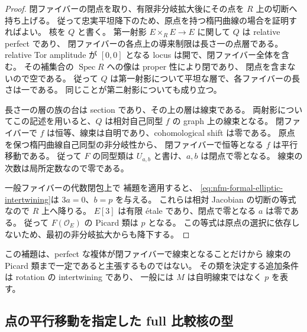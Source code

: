 \begin{proof}
閉ファイバーの閉点を取り、有限非分岐拡大後にその点を $R$ 上の切断へ持ち上げる。
従って忠実平坦降下のため、原点を持つ楕円曲線の場合を証明すればよい。
核を $Q$ と書く。
第一射影 $E\times_R E\to E$ に関して $Q$ は relative perfect であり、
閉ファイバーの各点上の導来制限は長さ一の点層である。
relative Tor amplitude が $[0,0]$ となる locus は開で、閉ファイバー全体を含む。
その補集合の $\operatorname{Spec}R$ への像は proper 性により閉であり、
閉点を含まないので空である。
従って $Q$ は第一射影について平坦な層で、各ファイバーの長さは一である。
同じことが第二射影についても成り立つ。

長さ一の層の族の台は section であり、その上の層は線束である。
両射影についてこの記述を用いると、$Q$ は相対自己同型 $f$ の graph 上の線束となる。
閉ファイバーで $f$ は恒等、線束は自明であり、cohomological shift は零である。
原点を保つ楕円曲線自己同型の非分岐性から、
閉ファイバーで恒等となる $f$ は平行移動である。
従って $F$ の同型類は $U_{a,b}$ と書け、$a,b$ は閉点で零となる。
線束の次数は局所定数なので零である。

一般ファイバーの代数閉包上で
補題を適用すると、
\eqref{eq:nfm-formal-elliptic-intertwining}は $3a=0$、$b=p$ を与える。
これらは相対 Jacobian の切断の等式なので $R$ 上へ降りる。
$E[3]$ は有限 \'etale であり、閉点で零となる $a$ は零である。
従って $F(\mathcal O_E)$ の Picard 類は $p$ となる。
この等式は原点の選択に依存しないため、最初の非分岐拡大からも降下する。
\end{proof}

この補題は、perfect な複体が閉ファイバーで線束となることだけから
線束の Picard 類まで一定であると主張するものではない。
その類を決定する追加条件は rotation の intertwining であり、
一般には $M$ は自明線束ではなく $p$ を表す。

\subsection{点の平行移動を指定した full 比較核の型}

